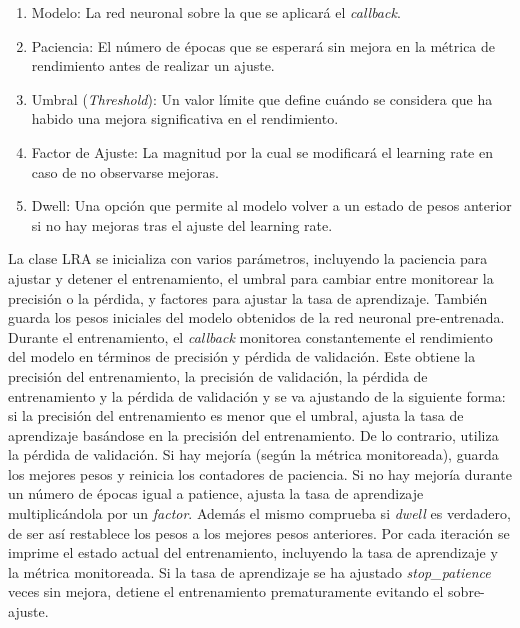 \begin{enumerate}
   \item Modelo: La red neuronal sobre la que se aplicará el \textit{callback}.
   \item Paciencia: El número de épocas que se esperará sin mejora en la métrica de rendimiento antes de realizar un ajuste.
   \item Umbral (\textit{Threshold}): Un valor límite que define cuándo se considera que ha habido una mejora significativa en el rendimiento.
   \item Factor de Ajuste: La magnitud por la cual se modificará el learning rate en caso de no observarse mejoras.
   \item Dwell: Una opción que permite al modelo volver a un estado de pesos anterior si no hay mejoras tras el ajuste del learning rate.
\end{enumerate}

La clase LRA se inicializa con varios parámetros, incluyendo la paciencia para ajustar y detener el entrenamiento, el umbral para cambiar entre monitorear la precisión o la pérdida, y factores para ajustar la tasa de aprendizaje. También guarda los pesos iniciales del modelo obtenidos de la red neuronal pre-entrenada. Durante el entrenamiento, el \textit{callback} monitorea constantemente el rendimiento del modelo en términos de precisión y pérdida de validación. Este obtiene la precisión del entrenamiento, la precisión de validación, la pérdida de entrenamiento y la pérdida de validación y se va ajustando de la siguiente forma: si la precisión del entrenamiento es menor que el umbral, ajusta la tasa de aprendizaje basándose en la precisión del entrenamiento. De lo contrario, utiliza la pérdida de validación. Si hay mejoría (según la métrica monitoreada), guarda los mejores pesos y reinicia los contadores de paciencia. Si no hay mejoría durante un número de épocas igual a patience, ajusta la tasa de aprendizaje multiplicándola por un \textit{factor}. Además el mismo comprueba si \textit{dwell} es verdadero, de ser así restablece los pesos a los mejores pesos anteriores. Por cada iteración se imprime el estado actual del entrenamiento, incluyendo la tasa de aprendizaje y la métrica monitoreada. Si la tasa de aprendizaje se ha ajustado \textit{stop\_patience} veces sin mejora, detiene el entrenamiento prematuramente evitando el sobre-ajuste.

